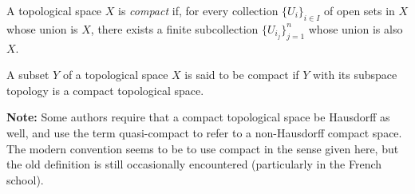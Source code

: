 \documentclass{article}
\begin{document}
A topological space $X$ is {\em compact} if, for every collection $\{U_i\}_{i \in I}$ of open sets in $X$ whose union is $X$, there exists a finite subcollection $\{U_{i_j}\}_{j=1}^n$ whose union is also $X$.

A subset $Y$ of a topological space $X$ is said to be compact if $Y$ with its subspace topology is a compact topological space.

\textbf{Note:} Some authors require that a compact topological space be Hausdorff as well, and use the term quasi-compact to refer to a non-Hausdorff compact space. The modern convention seems to be to use compact in the sense given here, but the old definition is still occasionally encountered (particularly in the French school).
\end{document}
